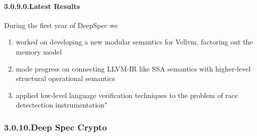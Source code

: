 \documentclass[12pt,twoside]{article}
\begin{document}
\paragraph{3.0.9.0.\hspace*{0.5em}Latest Results}\label{sec-latest-results}%

\noindent{}During the first year of DeepSpec we%

\begin{enumerate}%

\item{}
worked on developing a new modular semantics for Vellvm, factoring out the memory model%

\item{}
made progress on connecting LLVM-IR like SSA semantics with higher-level structural operational semantics%

\item{}
applied low-level language verification techniques to the problem of race detectection instrumentation"%
\end{enumerate}%

\subsubsection{3.0.10.\hspace*{0.5em}Deep Spec Crypto}\label{sec-deep-spec-crypto}%
\end{document}
